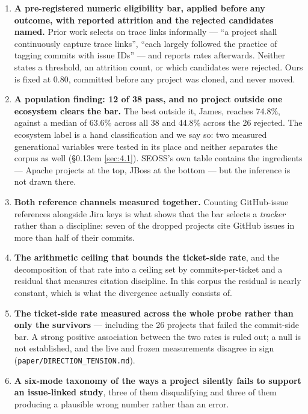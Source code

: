 \documentclass[sigconf,review,anonymous]{acmart}
\begin{document}
\begin{enumerate}
\item \textbf{A pre-registered numeric eligibility bar, applied before any outcome, with reported attrition and the rejected candidates named.} Prior work selects on trace links informally --- ``a project shall continuously capture trace links'', ``each largely followed the practice of tagging commits with issue IDs'' --- and reports rates afterwards. Neither states a threshold, an attrition count, or which candidates were rejected. Ours is fixed at 0.80, committed before any project was cloned, and never moved.
\item \textbf{A population finding: 12 of 38 pass, and no project outside one ecosystem clears the bar.} The best outside it, James, reaches 74.8\%, against a median of 63.6\% across all 38 and 44.8\% across the 26 rejected. The ecosystem label is a hand classification and we say so: two measured generational variables were tested in its place and neither separates the corpus as well (\S\kern0.13em \ref{sec:4.1}). SEOSS's own table contains the ingredients --- Apache projects at the top, JBoss at the bottom --- but the inference is not drawn there.
\item \textbf{Both reference channels measured together.} Counting GitHub-issue references alongside Jira keys is what shows that the bar selects a \emph{tracker} rather than a discipline: seven of the dropped projects cite GitHub issues in more than half of their commits.
\item \textbf{The arithmetic ceiling that bounds the ticket-side rate}, and the decomposition of that rate into a ceiling set by commits-per-ticket and a residual that measures citation discipline. In this corpus the residual is nearly constant, which is what the divergence actually consists of.
\item \textbf{The ticket-side rate measured across the whole probe rather than only the survivors} --- including the 26 projects that failed the commit-side bar. A strong positive association between the two rates is ruled out; a null is not established, and the live and frozen measurements disagree in sign (\texttt{paper/\allowbreak{}DIRECTION\_\allowbreak{}TENSION.\allowbreak{}md}).
\item \textbf{A six-mode taxonomy of the ways a project silently fails to support an issue-linked study}, three of them disqualifying and three of them producing a plausible wrong number rather than an error.
\end{enumerate}
\end{document}

